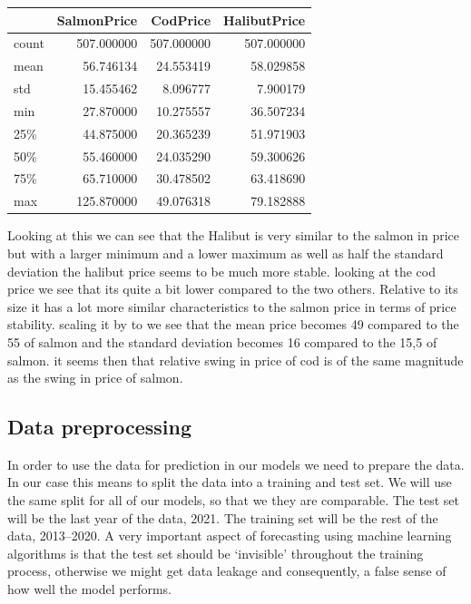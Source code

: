 \begin{tabular}{lrrr}
    \toprule
    {} &  SalmonPrice &    CodPrice &  HalibutPrice \\
    \midrule
    count &   507.000000 &  507.000000 &    507.000000 \\
    mean  &    56.746134 &   24.553419 &     58.029858 \\
    std   &    15.455462 &    8.096777 &      7.900179 \\
    min   &    27.870000 &   10.275557 &     36.507234 \\
    25\%   &    44.875000 &   20.365239 &     51.971903 \\
    50\%   &    55.460000 &   24.035290 &     59.300626 \\
    75\%   &    65.710000 &   30.478502 &     63.418690 \\
    max   &   125.870000 &   49.076318 &     79.182888 \\
    \bottomrule
    \end{tabular}

Looking at this we can see that the Halibut is very similar to the salmon in price but with a larger minimum and a lower maximum as well as half the standard deviation the halibut price seems to be much more stable. looking at the cod price we see that its quite a bit lower compared to the two others. Relative to its size it has a lot more similar characteristics to the salmon price in terms of price stability. scaling it by to we see that the mean price becomes 49 compared to the 55 of salmon and the standard deviation becomes 16 compared to the 15,5 of salmon. it seems then that relative swing in price of cod is of the same magnitude as the swing in price of salmon.

\subsection{Data preprocessing}
In order to use the data for prediction in our models we need to prepare the data. In our case this means to split the data into a training and test set. We will use the same split for all of our models, so that we they are comparable. The test set will be the last year of the data, 2021. The training set will be the rest of the data, 2013--2020. A very important aspect of forecasting using machine learning algorithms is that the test set should be `invisible' throughout the training process, otherwise we might get data leakage and consequently, a false sense of how well the model performs.~\parencite{brownlee_2016}

